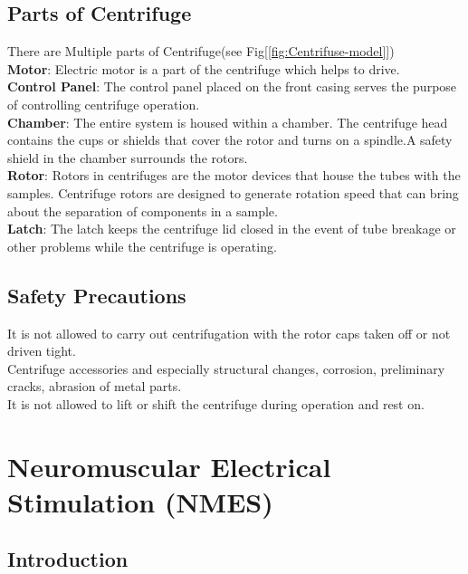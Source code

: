 \documentclass[12pt]{article}
\begin{document}
\subsection{Parts of Centrifuge}
There are Multiple parts of Centrifuge(see Fig[\ref{fig:Centrifuse-model}])\cite{Microhub:Centrifuge}\\
\textbf{ Motor}: Electric motor is a part of the centrifuge which helps to drive.\\
\textbf{ Control Panel}: The control panel placed on the front casing serves the purpose of controlling centrifuge operation.\\
 \textbf{ Chamber}: The entire system is housed within a chamber. The centrifuge head contains the cups or shields that cover the rotor and turns on a spindle.A safety shield in the chamber surrounds the rotors.\\
 \textbf{ Rotor}: Rotors in centrifuges are the motor devices that house the tubes with the samples. Centrifuge rotors are designed to generate rotation speed that can bring about the separation of components in a sample.\\
 \textbf{ Latch}: The latch keeps the centrifuge lid closed in the event of tube breakage or other problems while the centrifuge is operating.
 \vspace{-3mm}
 \subsection{Safety Precautions}
 It is not allowed to carry out centrifugation with the rotor caps taken off or not driven tight.\\
 Centrifuge accessories and especially structural changes, corrosion, preliminary cracks, abrasion of metal parts.\\
 It is not allowed to lift or shift the centrifuge during operation and rest on.
 
 \section{Neuromuscular Electrical Stimulation (NMES)}
 \subsection{Introduction}
 
\end{document}
